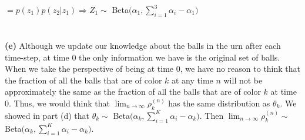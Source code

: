 \documentclass[submit]{harvardml}
\begin{document}
$=p(z_1)p(z_2|z_1)\Rightarrow Z_1\sim$ Beta$\Bigg(\alpha_1,\displaystyle\sum_{i=1}^{3}\alpha_i-\alpha_1\Bigg)$\\\\\\

\textbf{(e)} %
Although we update our knowledge about the balls in the urn after each time-step, at time $0$ the only information we have is the original set of balls. When we take the perspective of being at time $0$, we have no reason to think that the fraction of all the balls that are of color $k$ at any time $n$ will not be approximately the same as the fraction of all the balls that are of color $k$ at time $0$. Thus, we would think that $\lim_{n\rightarrow\infty}\rho_k^{(n)}$ has the same distribution as $\theta_k$. We showed in part (d) that $\theta_k\sim$ Beta$\Bigg(\alpha_k,\displaystyle\sum_{i=1}^{K}\alpha_i-\alpha_k\Bigg)$. Then $\lim_{n\rightarrow\infty}\rho_k^{(n)}\sim$ Beta$\Bigg(\alpha_k,\displaystyle\sum_{i=1}^{K}\alpha_i-\alpha_k\Bigg)$.
\end{document}

